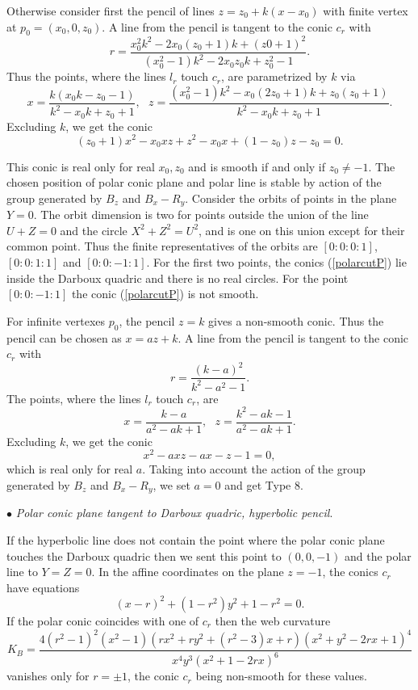\documentclass[11pt,a4paper]{article}
\begin{document}
Otherwise consider first the pencil of lines  $z=z_0+k(x - x_0)$ with  finite vertex at $p_0=(x_0,0,z_0)$. A line from the pencil is tangent to the conic $c_r$ with
$$
r=\frac{x_0^2k^2 - 2x_0(z_0 + 1)k + (z0 + 1)^2}{(x_0^2 - 1)k^2 - 2x_0z_0k + z_0^2 - 1}. 
$$ Thus the points, where the lines $l_r$ touch $c_r$, are parametrized by $k$ via 
$$
x=\frac{k(x_0k - z_0 - 1)}{k^2 - x_0k + z_0 + 1}, \ \ \ z=\frac{(x_0^2 - 1)k^2 - x_0(2z_0 + 1)k + z_0(z_0 + 1)}{k^2 - x_0k + z_0 + 1}. 
$$ 
Excluding $k$, we get the conic
\begin{equation}\label{polarcutP}
(z_0 + 1)x^2 - x_0xz +z^2- x_0x+ (1-z_0)z - z_0=0.
\end{equation}

This conic is real only for real $x_0,z_0$ and is smooth if and only if $z_0\ne -1.$ 
The chosen position of polar conic plane and polar line is stable by action of the group generated by $B_z$ and $B_x-R_y$. Consider the orbits of points in the plane $Y=0.$ The orbit dimension is two for points outside the union of the line $U+Z=0$ and the circle $X^2+Z^2=U^2$, and  is one on this union except for their common point.     
Thus the  finite representatives of the orbits are $[0:0:0:1]$, $[0:0:1:1]$ and $[0:0:-1:1].$  For the first two points, the conics (\ref{polarcutP}) lie inside the Darboux quadric and there is no real circles. For the point   $[0:0:-1:1]$ the conic (\ref{polarcutP}) is not smooth.  

For infinite vertexes $p_0$, the pencil $z=k$ gives a non-smooth conic. Thus the pencil can be chosen as $x=az+k$. A line from the pencil is tangent to the conic $c_r$ with
$$
r=\frac{(k-a)^2}{k^2 -a^2 - 1}. 
$$ The points, where the lines $l_r$ touch $c_r$, are  
$$
x=\frac{k-a}{a^2 - ak + 1}, \ \ \ z=\frac{k^2-ak-1}{a^2 - ak + 1}. 
$$ 
Excluding $k$, we get the conic 
$$
x^2-axz-ax-z-1=0, 
$$
which is real only for real $a$. Taking into account the action of the group generated by $B_z$ and $B_x-R_y$, we set $a=0$ and get Type 8. 

 \smallskip 
 $\bullet${ \it Polar conic plane tangent to Darboux quadric, hyperbolic pencil}.  
  
 \smallskip 
 If the hyperbolic line does not contain the point where the polar conic plane touches the Darboux quadric then we sent this point to $(0,0,-1)$ and the polar line to $Y=Z=0$.  In the affine coordinates on the plane $z=-1$, the conics $c_r$ have equations 
$$
(x - r)^2 + (1-r^2)y^2 + 1-r^2=0.
$$
If the polar conic coincides with one of $c_r$ then the web curvature  
$$
K_B=\frac{4(r^2 - 1)^2(x^2 - 1)( rx^2 + ry^2 +(r^2-3)x +r)(x^2 + y^2-2rx  + 1)^4}{x^4y^3(x^2 +1-2rx )^6}
$$
vanishes only for $r=\pm 1$, the conic $c_r$ being non-smooth for these values.
 
\end{document}
